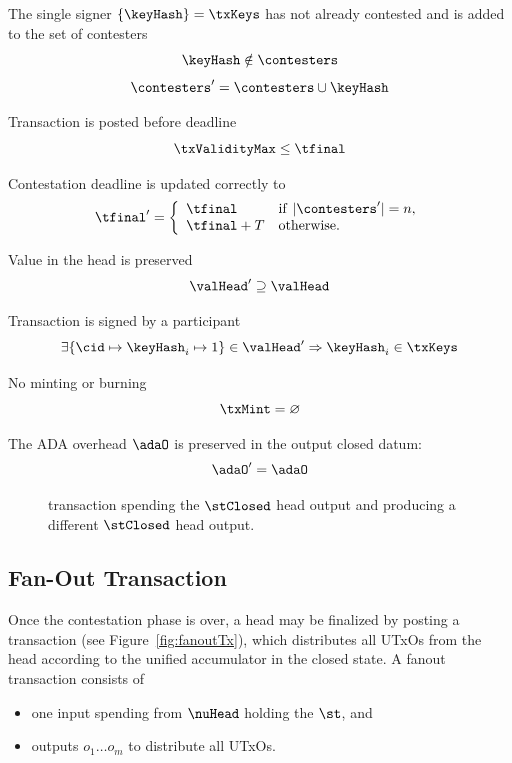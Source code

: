\begin{menumerate}
	\item The single signer $\{\keyHash\} = \txKeys$ has not already contested and is added to the set of contesters
	\[
		\keyHash \notin \contesters
	\]
	\[
		\contesters' = \contesters \cup \keyHash
	\]
	\item Transaction is posted before deadline
	\[
		\txValidityMax \leq \tfinal
	\]
	\item Contestation deadline is updated correctly to
	\[
		\tfinal' = \left\{\begin{array}{ll}
			\tfinal     & \mathrm{if} ~ |\contesters'| = n, \\
			\tfinal + T & \mathrm{otherwise.}
		\end{array}\right.
	\]
	\item Value in the head is preserved
	\[
		\valHead' \supseteq \valHead
	\]
	\item Transaction is signed by a participant
	\[
		\exists \{\cid \mapsto \keyHash_{i} \mapsto 1\} \in \valHead' \Rightarrow \keyHash_{i} \in \txKeys
	\]
	\item No minting or burning
	\[
		\txMint = \varnothing
	\]
	\item The ADA overhead $\adaO$ is preserved in the output closed datum:
	\[
		\adaO' = \adaO
	\]
\end{menumerate}

\begin{figure}[H]
	\centering
	
	\caption{\mtxContest{} transaction spending the $\stClosed$ head output and
		producing a different $\stClosed$ head output.}\label{fig:contestTx}
\end{figure}

\subsection{Fan-Out Transaction}\label{sec:fanout-tx}

Once the contestation phase is over, a head may be finalized by posting a
\mtxFanout{} transaction (see Figure~\ref{fig:fanoutTx}), which
distributes all UTxOs from the head according to the unified accumulator in the closed state. A fanout transaction consists of
\begin{itemize}
	\item one input spending from $\nuHead$ holding the $\st$, and
	\item outputs $o_{1} \dots o_{m}$ to distribute all UTxOs.
\end{itemize}

